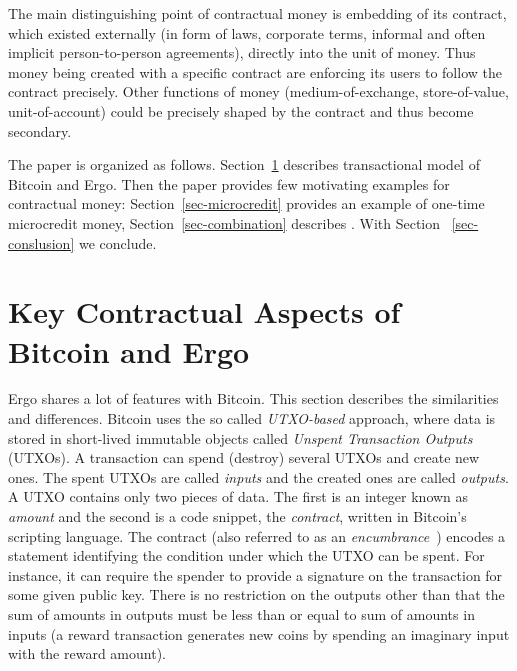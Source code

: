 \documentclass[]{llncs}   %
\begin{document}
The main distinguishing point of contractual money is embedding of its contract, which existed externally (in form of laws, corporate terms, informal and often implicit person-to-person agreements), directly into the unit of money. Thus money being created with a specific contract are enforcing its users to follow the contract precisely. Other functions of money (medium-of-exchange, store-of-value, unit-of-account) could be precisely shaped by the contract and thus become secondary.

The paper is organized as follows. Section~\ref{sec-txmodel} describes transactional model of Bitcoin and Ergo. Then the paper provides few motivating examples for contractual money: Section~\ref{sec-microcredit} provides an example of one-time microcredit money, Section~\ref{sec-combination} describes . With Section
~\ref{sec-conslusion} we conclude.


\section{Key Contractual Aspects of Bitcoin and Ergo }
\label{sec-txmodel}

Ergo shares a lot of features with Bitcoin. This section describes the similarities and differences. 
Bitcoin uses the so called {\em UTXO-based} approach, where data is stored in short-lived immutable objects called {\em Unspent Transaction Outputs} (UTXOs). A transaction can spend (destroy) several UTXOs and create new ones. The spent UTXOs are called {\em inputs} and the created ones are called {\em outputs}. A UTXO contains only two pieces of data. The first is an integer known as {\em amount} and the second is a code snippet, the {\em contract}, written in Bitcoin's scripting language. The contract (also referred to as  an {\em encumbrance}~\cite{Antonopoulos:2014:MBU:2695500}) encodes a statement identifying the condition under which the UTXO can be spent. For instance, it can require the spender to provide a signature on the transaction for some given public key.
There is no restriction on the outputs other than that the sum of amounts in outputs must be less than or equal to sum of amounts in inputs (a reward transaction generates new coins by spending an imaginary input with the reward amount).
\end{document}
